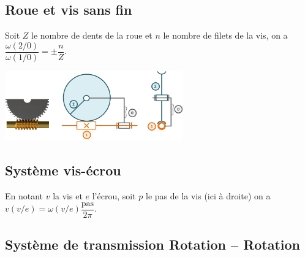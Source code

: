 \subsection*{Roue et vis sans fin}
\begin{minipage}[c]{.4\linewidth}
\begin{resultat}
Soit $Z$ le nombre de dents de la roue et $n$ le nombre de filets de la vis, on a 
$\dfrac{\omega(2/0)}{\omega(1/0)} = \pm \dfrac{n}{Z}$.
\end{resultat}
\end{minipage}\hfill
\begin{minipage}[c]{.6\linewidth}
\begin{center}
\includegraphics[height=3cm]{images/fig_04.png}
\end{center}
\end{minipage}


\subsection*{Système vis-écrou}
\begin{resultat}
En notant $v$ la vis et $e$ l'écrou, soit $p$ le pas de la vis (ici à droite) on a $v(v/e)=\omega(v/e) \dfrac{\text{pas}}{2 \pi}$.
\end{resultat}

\subsection*{Système de transmission Rotation -- Rotation}

